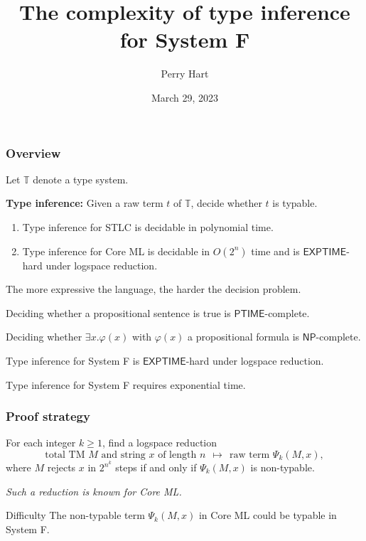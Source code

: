 \documentclass{beamer}
\title{The complexity of type inference for System F}
\author{Perry Hart}
\institute{UMN PL Seminar}
\date{March 29, 2023}
\newcommand{\0}{\mathbf{0}}
\newcommand{\1}{\mathbf{1}}
\newcommand{\2}{\mathbf{2}}
\begin{document}
\frame{\titlepage}

\begin{frame}
\frametitle{Overview}

Let $\mathbb{T}$ denote a type system. 

\medskip

\textbf{Type inference:}  Given a raw term $t$ of $\mathbb{T}$, decide whether $t$ is typable.

\medskip

\begin{theorem}
\begin{enumerate}
\item Type inference for STLC is decidable in polynomial time.
\item Type inference for Core ML is decidable in $O(2^n)$ time and is $\mathsf{EXPTIME}$-hard under logspace reduction.
\end{enumerate}
\end{theorem}

\end{frame}

\begin{frame}

The more expressive the language, the harder the decision problem.

\smallskip

\begin{example}
Deciding whether a propositional sentence is true is $\mathsf{PTIME}$-complete.

\medskip

Deciding whether $\exists{x}.\varphi(x)$ with $\varphi(x)$ a propositional formula is $\mathsf{NP}$-complete.
\end{example}

\bigskip

\begin{theorem}
Type inference for System F is $\mathsf{EXPTIME}$-hard under logspace reduction. 
\end{theorem}

\begin{corollary}
Type inference for System F requires exponential time.
\end{corollary}

\end{frame}

\begin{frame}
\frametitle{Proof strategy}

For each integer $k \geq 1$, find a logspace reduction
\[
\text{total TM $M$ and string $x$ of length $n$} \ \ \mapsto \ \  \text{raw term $\Psi_k(M, x)$}
,\]
where $M$ rejects $x$ in $2^{n^k}$ steps if and only if $\Psi_k(M, x)$ is non-typable.

\bigskip

\emph{Such a reduction is known for Core ML.}

\smallskip

\begin{block}{Difficulty}
The non-typable term $\Psi_k(M, x)$ in Core ML could be typable in System F.
\end{block}
\end{frame}
\end{document}
